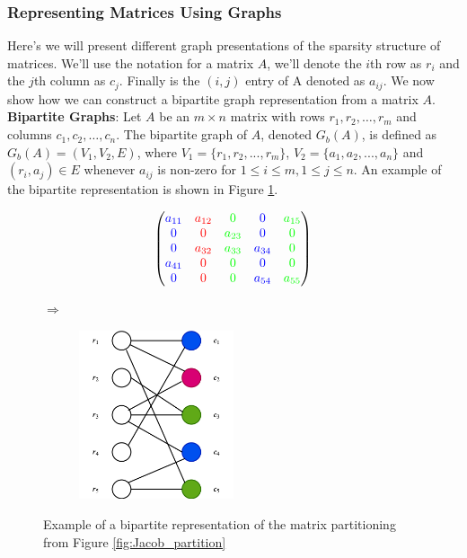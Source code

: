 \subsubsection*{Representing Matrices Using Graphs}
Here's we will present different graph presentations of the 
sparsity structure of matrices. We'll use the notation for a 
matrix $A$, we'll denote the $i$th row as $r_i$ and the $j$th column
as $c_j$. Finally is the $(i,j)$ entry of A denoted as $a_{ij}$. We now show how we can
construct a bipartite graph representation from a matrix $A$. \newline 
\textbf{Bipartite Graphs}: Let $A$ be an $m \times n$ matrix with rows $r_1, r_2, \dots, r_m$ and columns $c_1, c_2, \dots, c_n$. The bipartite graph of $A$, denoted $G_b(A)$, is defined as $G_b(A) = (V_1, V_2, E)$, where $V_1 = \{r_1, r_2, ..., r_m\}$, $V_2 = \{a_1, a_2, ..., a_n\}$ and $(r_i, a_j) \in E$ whenever $a_{ij}$ is non-zero for $1 \leq i \leq m, 1 \leq j \leq n$.  An example of the bipartite representation is shown in Figure \ref{fig:bipartite}. 
\begin{figure}[H]
	\centering
	\begin{subfigure}{0.45\linewidth}
	$$ \left(\begin{matrix}
{\color{blue} a_{11}} & {\color{red} a_{12}} & {\color{green} 0 }        &  {\color{blue} 0 }       & {\color{green} a_{15}} \\
{\color{blue} 0}        & {\color{red} 0 }       & {\color{green} a_{23}}  &  {\color{blue} 0 }      & {\color{green} 0} \\
{\color{blue} 0}        & {\color{red} a_{32}} &  {\color{green} a_{33}}  & {\color{blue} a_{34}} & {\color{green} 0 } \\
{\color{blue} a_{41}} & {\color{red} 0 }       & {\color{green} 0 }         & {\color{blue} 0 }        & {\color{green} 0} \\
{\color{blue} 0 }       & {\color{red} 0 }       & {\color{green} 0 }         & {\color{blue} a_{54}} & {\color{green} a_{55} }
\end{matrix}\right) $$

	\end{subfigure}
	 $\Rightarrow$ \hfill 
	\begin{subfigure}{0.45\linewidth}
	\includegraphics[width=0.5\textwidth]{pics/bipartite.png} 
	\end{subfigure}
     \caption{Example of a bipartite representation of the matrix partitioning from Figure \ref{fig:Jacob_partition}}
	\label{fig:bipartite}
\end{figure}
